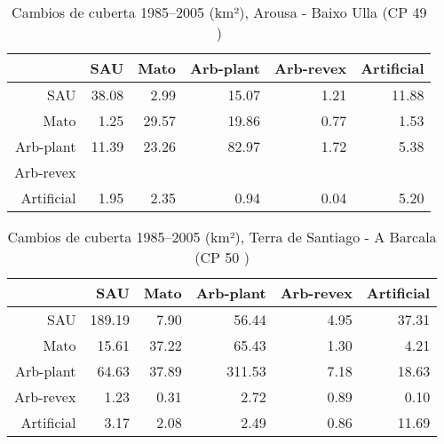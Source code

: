 \begin{table}[p]
\centering
\caption{Cambios de cuberta 1985--2005 (km²), Arousa - Baixo Ulla (CP 49 )} 
\label{TaboaContinxCP49}
\begin{tabular}{rrrrrr}
  \hline
 & SAU & Mato & Arb-plant & Arb-revex & Artificial \\ 
  \hline
SAU & 38.08 & 2.99 & 15.07 & 1.21 & 11.88 \\ 
  Mato & 1.25 & 29.57 & 19.86 & 0.77 & 1.53 \\ 
  Arb-plant & 11.39 & 23.26 & 82.97 & 1.72 & 5.38 \\ 
  Arb-revex &  &  &  &  &  \\ 
  Artificial & 1.95 & 2.35 & 0.94 & 0.04 & 5.20 \\ 
   \hline
\end{tabular}
\end{table}
\begin{table}[p]
\centering
\caption{Cambios de cuberta 1985--2005 (km²), Terra de Santiago - A Barcala (CP 50 )} 
\label{TaboaContinxCP50}
\begin{tabular}{rrrrrr}
  \hline
 & SAU & Mato & Arb-plant & Arb-revex & Artificial \\ 
  \hline
SAU & 189.19 & 7.90 & 56.44 & 4.95 & 37.31 \\ 
  Mato & 15.61 & 37.22 & 65.43 & 1.30 & 4.21 \\ 
  Arb-plant & 64.63 & 37.89 & 311.53 & 7.18 & 18.63 \\ 
  Arb-revex & 1.23 & 0.31 & 2.72 & 0.89 & 0.10 \\ 
  Artificial & 3.17 & 2.08 & 2.49 & 0.86 & 11.69 \\ 
   \hline
\end{tabular}
\end{table}
